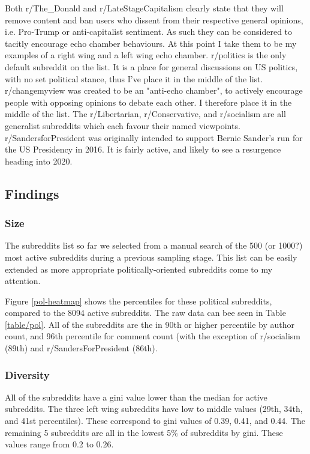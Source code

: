 Both r/The\_Donald and r/LateStageCapitalism clearly state that they will remove content and ban users who dissent from their respective general opinions, i.e. Pro-Trump or anti-capitalist sentiment. As such they can be considered to tacitly encourage echo chamber behaviours. At this point I take them to be my examples of a right wing and a left wing echo chamber. r/politics is the only default subreddit on the list. It is a place for general discussions on US politics, with no set political stance, thus I've place it in the middle of the list. r/changemyview was created to be an "anti-echo chamber", to actively encourage people with opposing opinions to debate each other. I therefore place it in the middle of the list. The r/Libertarian, r/Conservative, and r/socialism are all generalist subreddits which each favour their named viewpoints. r/SandersforPresident was originally intended to support Bernie Sander's run for the US Presidency in 2016. It is fairly active, and likely to see a resurgence heading into 2020.

\subsection{Findings}

\subsubsection{Size}
The subreddits list so far we selected from a manual search of the 500 (or 1000?) most active subreddits during a previous sampling stage. This list can be easily extended as more appropriate politically-oriented subreddits come to my attention.

Figure \ref{pol-heatmap} shows the percentiles for  these political subreddits, compared to the 8094 active subreddits. The raw data can bee seen in Table \ref{table/pol}. All of the subreddits are the in 90th or higher percentile by author count, and 96th percentile for comment count (with the exception of r/socialism (89th) and r/SandersForPresident (86th). 

\subsubsection{Diversity}
All of the subreddits have a gini value lower than the median for active subreddits. The three left wing subreddits have low to middle values (29th, 34th, and 41st percentiles). These correspond to gini values of 0.39, 0.41, and 0.44. The remaining 5 subreddits are all in the lowest 5\% of subreddits by gini. These values range from 0.2 to 0.26. 

